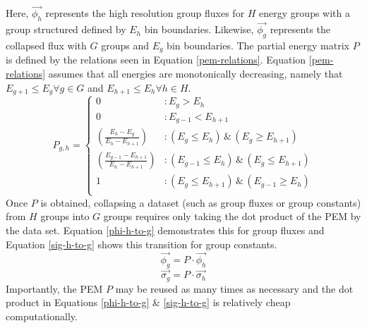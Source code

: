 \documentclass{article}
\begin{document}
Here, $\vec{\phi_h}$ represents the high resolution group fluxes for $H$ energy groups with
a group structured defined by $E_h$ bin boundaries. Likewise, $\vec{\phi_g}$ represents
the collapsed flux with $G$ groups and $E_g$ bin boundaries. The partial energy
matrix $P$ is defined by the relations seen in Equation \ref{pem-relations}.
Equation \ref{pem-relations} assumes that all energies are monotonically decreasing, namely
that $E_{g+1} \le E_{g} \forall g\in G$ and $E_{h+1} \le E_{h} \forall h\in H$.
\begin{equation}
\label{pem-relations}
P_{g,h} = \left\{
\begin{array}{ll}
    0 & : E_{g} > E_{h} \\
    0 & : E_{g-1} < E_{h+1} \\
    \left(\frac{E_h - E_g}{E_h - E_{h+1}}\right) & : (E_{g} \le E_h) \, \& \, (E_{g} \ge E_{h+1}) \\
    \left(\frac{E_{g-1} - E_{h+1}}{E_h - E_{h+1}}\right) & : (E_{g-1} \le E_h) \, \& \, (E_{g} \le E_{h+1}) \\
    1 & : (E_{g} \le E_{h+1}) \, \& \, (E_{g-1} \ge E_{h}) \\
\end{array}
\right.
\end{equation}
Once $P$ is obtained, collapsing a dataset (such as group fluxes or group constants) from $H$
groups into $G$ groups requires only taking the dot product of the PEM
by the data set. Equation \ref{phi-h-to-g} demonstrates this for group fluxes and Equation
\ref{sig-h-to-g} shows this transition for group constants.
\begin{equation}
\label{phi-h-to-g}
\vec{\phi_g} = P \cdot \vec{\phi_h}
\end{equation}
\begin{equation}
\label{sig-h-to-g}
\vec{\sigma_g} = P \cdot \vec{\sigma_h}
\end{equation}
Importantly, the PEM $P$ may be reused as many times as necessary and the dot product in
Equations \ref{phi-h-to-g} \& \ref{sig-h-to-g} is relatively cheap computationally.
\end{document}

